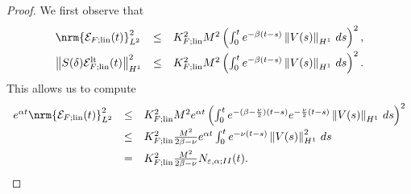 \documentclass[10pt]{articleHJ}
\newcommand{\e}{\ensuremath{\varepsilon}}
\renewcommand{\a}{\ensuremath{\alpha}}
\DeclarePairedDelimiter{\nrm}\lVert\rVert
\newcommand{\norm}[1]{\left\Vert#1\right\Vert}		%
\numberwithin{equation}{section}
\begin{document}
\begin{proof}
We first observe that
\begin{equation}
\begin{array}{lcl}
\nrm{\mathcal{E}_{F;\mathrm{lin}}(t)}_{L^2}^2
& \le &
   K_{F;\mathrm{lin}}^2 M^2  \left(
     \int_0^{t} e^{-\beta(t - s) } \norm{V(s)}_{H^1} \, ds \right)^2 ,
\\[0.2cm]
%
\norm{S(\delta)\mathcal{E}^{\mathrm{lt}}_{F;\mathrm{lin}}(t)}_{H^1}^2
& \le &
   K_{F;\mathrm{lin}}^2 M^2  \left(
     \int_0^{t} e^{-\beta(t - s) } \norm{V(s)}_{H^1} \, ds \right)^2 .
\end{array}
\end{equation}
This allows us to compute
\begin{equation}
\begin{array}{lcl}
e^{\a t }\nrm{\mathcal{E}_{F;\mathrm{lin}}(t)}_{L^2}^2
  & \le &
  K_{F;\mathrm{lin}}^2 M^2 e^{\alpha t} \left(
     \int_0^{t} e^{- (\beta - \frac{\nu}{2} )(t - s) } e^{-\frac{\nu}{2} ( t - s) } \norm{V(s)}_{H^1} \, ds \right)^2
\\[0.2cm]
& \le &
  K_{F;\mathrm{lin}}^2 \frac{M^2}{2 \beta - \nu} e^{\alpha t}
     \int_0^{t} e^{- \nu ( t - s) } \norm{V(s)}_{H^1}^2 \, ds
\\[0.2cm]
& = &
  K_{F;\mathrm{lin}}^2 \frac{M^2}{2 \beta - \nu} N_{\e,\alpha;II}(t) .
\end{array}
\end{equation}


\end{proof}
\end{document}
